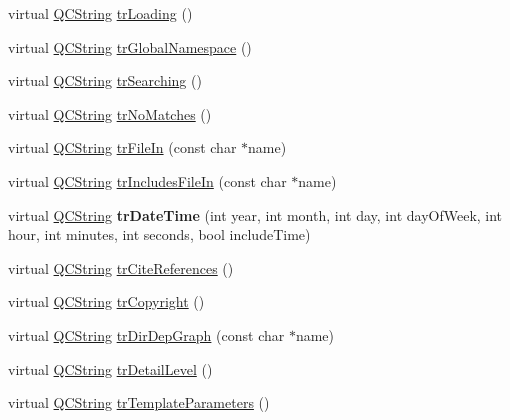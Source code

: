 \begin{DoxyCompactItemize}
\item 
virtual \mbox{\hyperlink{class_q_c_string}{Q\+C\+String}} \mbox{\hyperlink{class_translator_dutch_a7bd89c322b5c702e4807d45c9fdfa946}{tr\+Loading}} ()
\item 
virtual \mbox{\hyperlink{class_q_c_string}{Q\+C\+String}} \mbox{\hyperlink{class_translator_dutch_a65e402eac00bb3e5f34557bcd7da61d3}{tr\+Global\+Namespace}} ()
\item 
virtual \mbox{\hyperlink{class_q_c_string}{Q\+C\+String}} \mbox{\hyperlink{class_translator_dutch_aefc546c44e62a94715e808485573a565}{tr\+Searching}} ()
\item 
virtual \mbox{\hyperlink{class_q_c_string}{Q\+C\+String}} \mbox{\hyperlink{class_translator_dutch_a6398b14c41888622c97f15957c609141}{tr\+No\+Matches}} ()
\item 
virtual \mbox{\hyperlink{class_q_c_string}{Q\+C\+String}} \mbox{\hyperlink{class_translator_dutch_a6800d32bd5646807f9bec6194b79a11e}{tr\+File\+In}} (const char $\ast$name)
\item 
virtual \mbox{\hyperlink{class_q_c_string}{Q\+C\+String}} \mbox{\hyperlink{class_translator_dutch_acc4990897794e3f5a18bb1e1731b472a}{tr\+Includes\+File\+In}} (const char $\ast$name)
\item 
\mbox{\label{class_translator_dutch_a040430d74361c3d66ee0c4e87168c9bc}} 
virtual \mbox{\hyperlink{class_q_c_string}{Q\+C\+String}} {\bfseries tr\+Date\+Time} (int year, int month, int day, int day\+Of\+Week, int hour, int minutes, int seconds, bool include\+Time)
\item 
virtual \mbox{\hyperlink{class_q_c_string}{Q\+C\+String}} \mbox{\hyperlink{class_translator_dutch_a7dcbb963bda45717faff39aceda64f9b}{tr\+Cite\+References}} ()
\item 
virtual \mbox{\hyperlink{class_q_c_string}{Q\+C\+String}} \mbox{\hyperlink{class_translator_dutch_ab7c37e72e5ff7bf579cfa1ee13de13e9}{tr\+Copyright}} ()
\item 
virtual \mbox{\hyperlink{class_q_c_string}{Q\+C\+String}} \mbox{\hyperlink{class_translator_dutch_a8c004f960001b878331abb3cc622dd1a}{tr\+Dir\+Dep\+Graph}} (const char $\ast$name)
\item 
virtual \mbox{\hyperlink{class_q_c_string}{Q\+C\+String}} \mbox{\hyperlink{class_translator_dutch_ac52d115b615423a09db774a5dcf609ae}{tr\+Detail\+Level}} ()
\item 
virtual \mbox{\hyperlink{class_q_c_string}{Q\+C\+String}} \mbox{\hyperlink{class_translator_dutch_a72b684311f1026c8af57f7dc4990222f}{tr\+Template\+Parameters}} ()

\end{DoxyCompactItemize}
